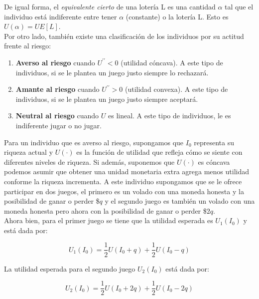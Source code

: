 De igual forma, el \textit{equivalente cierto} de una lotería L es una cantidad $\alpha$ tal que el individuo está indiferente entre tener $\alpha$ (constante) o la lotería L. Esto es $U(\alpha) = UE[L]$. \\

Por otro lado, también existe una clasificación de los individuos por su actitud frente al riesgo: 

\begin{enumerate}
    \item \textbf{Averso al riesgo} cuando $U^{\prime \prime} < 0$ (utilidad cóncava). A este tipo de individuos, si se le plantea un juego justo siempre lo rechazará.
    \item \textbf{Amante al riesgo} cuando $U^{\prime \prime} > 0$ (utilidad convexa). A este tipo de individuos, si se le plantea un juego justo siempre aceptará.
    \item \textbf{Neutral al riesgo} cuando $U$ es lineal. A este tipo de individuos, le es indiferente jugar o no jugar.
\end{enumerate}

Para un individuo que es averso al riesgo, supongamos que $I_0$ representa su riqueza actual y $U(\cdot)$ es la función de utilidad que refleja cómo se siente con diferentes niveles de riqueza. Si además, suponemos que $U(\cdot)$ es cóncava podemos asumir que obtener una unidad monetaria extra agrega menos utilidad conforme la riqueza incrementa. A este individuo supongamos que se le ofrece participar en dos juegos, el primero es un volado con una moneda honesta y la posibilidad de ganar o perder \$$q$ y el segundo juego es también un volado con una moneda honesta pero ahora con la posibilidad de ganar o perder \$$2q$. \\

Ahora bien, para el primer juego se tiene que la utilidad esperada es $U_{1}(I_0)$ y está dada por: 

$$
U_{1}(I_0) = \frac{1}{2}U(I_0 + q) + \frac{1}{2}U(I_0 - q)
$$

La utilidad esperada para el segundo juego $U_{2}(I_0)$ está dada por:

$$
U_{2}(I_0) = \frac{1}{2}U(I_0 + 2q) + \frac{1}{2}U(I_0 - 2q)
$$ \\


